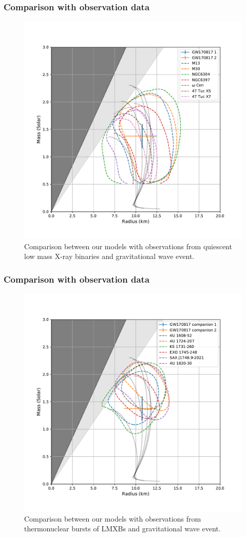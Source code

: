 \documentclass[hperref={pdfpagelabels=false}]{beamer}
\begin{document}
\begin{frame}
 \frametitle{Comparison with observation data}
 \begin{figure}
    \includegraphics[scale=0.3]{eos_compare_obsv1_GW.pdf}
    \caption{Comparison between our models with observations from quiescent low mass X-ray binaries and gravitational wave event.}
 \end{figure}
\end{frame}

\begin{frame}
 \frametitle{Comparison with observation data}
 \begin{figure}
    \includegraphics[scale=0.3]{eos_compare_obsv2_GW.pdf}
    \caption{Comparison between our models with observations from thermonuclear bursts of LMXBs and gravitational wave event.}
 \end{figure}
\end{frame}
\end{document}
